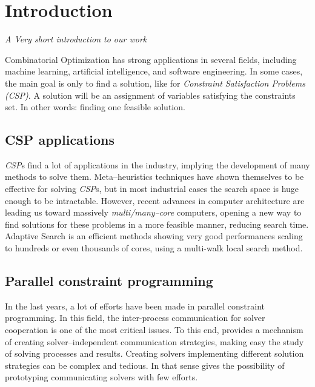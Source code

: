 \chapter{Introduction}
\label{chap:Intro}
\textit{A Very short introduction to our work}
\vfill
\minitoc
\newpage

Combinatorial Optimization has strong applications in several fields, including machine learning, artificial intelligence, and software engineering. In some cases, the main goal is only to find a solution, like for {\it Constraint Satisfaction Problems (CSP)}. A solution will be an assignment of variables satisfying the constraints set. In other words: finding one feasible solution.

\section{CSP applications}
{\it CSP}s find a lot of applications in the industry, implying the development of many methods to solve them. Meta--heuristics techniques have shown themselves to be effective for solving {\it CSP}s, but in most industrial cases the search space is huge enough to be intractable. However, recent advances in computer architecture are leading us toward massively {\it mul\-ti/many--core} computers, opening a new way to find solutions for these problems in a more feasible manner, reducing search time. Adaptive Search \cite{Diaz} is an efficient methods showing very good performances scaling to hundreds or even thousands of cores, using a multi-walk local search method. %

\section{Parallel constraint programming}
In the last years, a lot of efforts have been made in parallel constraint programming. In this field, the inter-process communication for solver cooperation is one of the most critical issues. 
To this end, \af{} provides a mechanism of creating solver--independent communication strategies, making easy the study of solving processes and results. Creating solvers implementing different solution strategies can be complex and tedious. In that sense \af{} gives the possibility of prototyping communicating solvers with few efforts.

